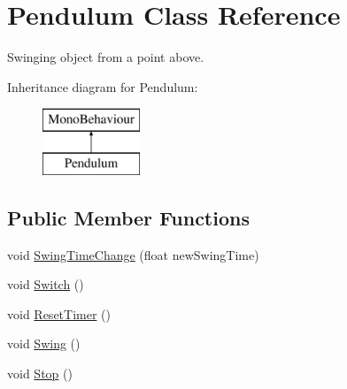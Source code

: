 \hypertarget{class_pendulum}{}\section{Pendulum Class Reference}
\label{class_pendulum}


Swinging object from a point above.  


Inheritance diagram for Pendulum\+:\begin{figure}[H]
\begin{center}
\leavevmode
\includegraphics[height=2.000000cm]{class_pendulum}
\end{center}
\end{figure}
\subsection*{Public Member Functions}
\begin{DoxyCompactItemize}
\item 
void \mbox{\hyperlink{class_pendulum_a92ffc3bfaffb36119d44ec1e294e7f94}{Swing\+Time\+Change}} (float new\+Swing\+Time)
\item 
void \mbox{\hyperlink{class_pendulum_a17768e1c761cd5cd094e75b1e70f3147}{Switch}} ()
\item 
void \mbox{\hyperlink{class_pendulum_a434f2a286d40ece8198d30a1511d5597}{Reset\+Timer}} ()
\item 
void \mbox{\hyperlink{class_pendulum_a56bbfd6f6dbd2ab68ea6497a7d1f4065}{Swing}} ()
\item 
void \mbox{\hyperlink{class_pendulum_a011916372c24b9024a1d2399c6baaf10}{Stop}} ()
\end{DoxyCompactItemize}
